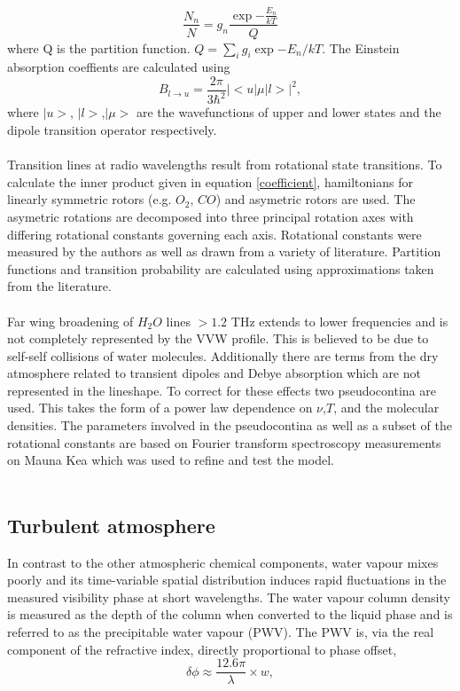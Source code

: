\begin{equation}
\frac{N_n}{N} = g_n \frac {\exp{-\frac{E_n}{kT}}}{Q}
\end{equation}
where Q is the partition function. $Q = \sum_i g_i  \exp{-E_n/kT}$. The Einstein absorption coeffients are calculated using 
\begin{equation}\label{coefficient}
B_{l \to u} = \frac{2\pi}{3\hbar^2} |<u|\mu|l>|^2,
\end{equation}
where $|u>$, $|l>$,$|\mu>$ are the wavefunctions of upper and lower states and the dipole transition operator respectively. \\
~\\
Transition lines at radio wavelengths result from rotational state transitions.  To calculate the inner product given in equation \ref{coefficient}, hamiltonians for linearly  symmetric rotors (e.g. $O_2$, $CO$) and asymetric rotors are used. The asymetric rotations are decomposed into three principal rotation axes with differing rotational constants governing each axis. Rotational constants were measured by the authors as well as drawn from a variety of literature. Partition functions and transition probability are calculated using approximations taken from the literature.\\
~\\
Far wing broadening of $H_2O$ lines $> 1.2$ THz extends to lower frequencies and is not completely represented by the VVW profile. This is believed to be due to self-self collisions of water molecules. Additionally there are terms from the dry atmosphere related to transient dipoles and Debye absorption which are not represented in the lineshape. To correct for these effects two pseudocontina are used. This takes the form of a power law dependence on $\nu$,$T$, and the molecular densities. The parameters involved in the pseudocontina as well as a subset of the rotational constants are based on Fourier transform spectroscopy measurements on Mauna Kea which was used to refine and test the model.\\
 ~\\

\subsection{Turbulent atmosphere} 

In contrast to the other atmospheric chemical components, water vapour mixes poorly and its time-variable spatial distribution induces rapid fluctuations in the measured visibility phase at short wavelengths. The water vapour column density is measured as the depth of the column when converted to the liquid phase and is referred to as the precipitable water vapour (PWV). The PWV is, via the real component of the refractive index, directly proportional to phase offset, 
\begin{equation}
\delta\phi \approx \frac{12.6\pi}{\lambda} \times w, 
\end{equation}\label{eq:phi-pwv}

